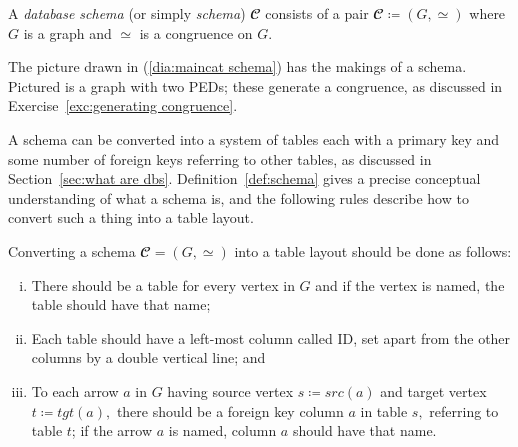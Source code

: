 \documentclass[../main/CT4S-EN-RU]{subfiles}
\begin{document}
\begin{proofRUS}
\end{proofRUS}

\begin{definitionENG}\label{def:schema}
A {\em database schema} (or simply {\em schema}) ${𝓒}$ consists of a pair ${𝓒}{\coloneqq}(G,\simeq)$ where $G$ is a graph and $\simeq$ is a congruence on $G.$ 
\end{definitionENG}

\begin{definitionRUS}\label{def:schema}
\end{definitionRUS}

\begin{exampleENG}
The picture drawn in (\ref{dia:maincat schema}) has the makings of a schema. Pictured is a graph with two PEDs; these generate a congruence, as discussed in Exercise~\ref{exc:generating congruence}.  
\end{exampleENG}

\begin{exampleRUS}
\end{exampleRUS}

\begin{blockENG}
A schema can be converted into a system of tables each with a primary key and some number of foreign keys referring to other tables, as discussed in Section~\ref{sec:what are dbs}. Definition~\ref{def:schema} gives a precise conceptual understanding of what a schema is, and the following rules describe how to convert such a thing into a table layout.
\end{blockENG}

\begin{blockRUS}
\end{blockRUS}

\begin{rulesENG}\label{rules:schema to tables}
Converting a schema ${𝓒}=(G,\simeq)$ into a table layout should be done as follows:
\begin{enumerate}[(i)]
\item There should be a table for every vertex in $G$ and if the vertex is named, the table should have that name;
\item Each table should have a left-most column called ID, set apart from the other columns by a double vertical line; and
\item To each arrow $a$ in $G$ having source vertex $s{\coloneqq}src(a)$ and target vertex $t{\coloneqq}tgt(a),$ there should be a foreign key column $a$ in table $s,$ referring to table $t$; if the arrow $a$ is named, column $a$ should have that name.
\end{enumerate}
\end{rulesENG}
\end{document}
